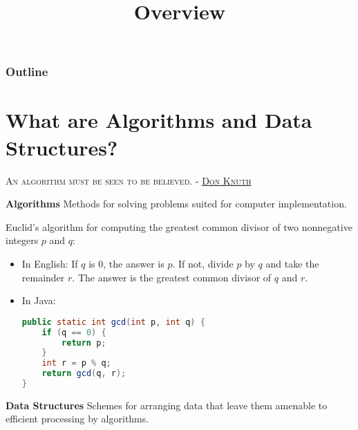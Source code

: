 \documentclass[8pt,a4paper,compress]{beamer}
\title{Overview}
\date{}
\begin{document}
\begin{frame}
\vfill
\titlepage
\end{frame}

\begin{frame}
\frametitle{Outline}
\tableofcontents
\end{frame}

\section{What are Algorithms and Data Structures?}
\begin{frame}[fragile]
\begin{flushright}
\tiny \textsc{An algorithm must be seen to be believed. - \href{http://en.wikipedia.org/wiki/Donald_Knuth}{Don Knuth}}
\end{flushright}

\pause
\textbf{Algorithms} Methods for solving problems suited for computer implementation.

\pause
\smallskip

Euclid's algorithm for computing the greatest common divisor of two nonnegative integers $p$ and $q$: 

\begin{itemize}
\item In English: If $q$ is 0, the answer is $p$. If not, divide $p$ by $q$ and take the remainder $r$. The answer is the greatest common divisor of $q$ and $r$.
\item In Java:
\begin{lstlisting}[language=Java]
public static int gcd(int p, int q) {
    if (q == 0) {
        return p;
    }
    int r = p % q;
    return gcd(q, r);
}
\end{lstlisting}
\end{itemize}

\pause
\smallskip

\textbf{Data Structures} Schemes for arranging data that leave them amenable to efficient processing by algorithms.
\end{frame}
\end{document}
